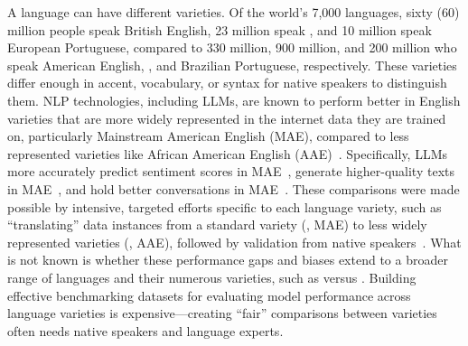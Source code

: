 

A language can have different varieties. 
Of the world's 7,000 languages, sixty (60) million people speak British English, 23 million speak \twChinese, and 10 million speak European Portuguese, compared to 330 million, 900 million, and 200 million who speak American English, \cnChinese, and Brazilian Portuguese, respectively. 
These varieties differ enough in accent, vocabulary, or syntax for native speakers to distinguish them. 
NLP technologies, including LLMs, are known to perform better in English varieties that are more widely represented in the internet data they are trained on, particularly Mainstream American English (MAE), compared to less represented varieties like African American English (AAE)~\cite{valuebench,multivaluebench}.
Specifically, LLMs more accurately predict sentiment scores in MAE~\cite{valuebench}, 
generate higher-quality texts in MAE~\cite{valuebench}, and 
hold better conversations in MAE~\cite{multivaluebench}.
These comparisons were made possible by intensive, targeted efforts specific to each language variety, such as 
``translating'' data instances from a standard variety (\eg, MAE) to less widely represented varieties (\eg, AAE), followed by validation from native speakers~\cite{valuebench,multivaluebench}.
What is not known is whether these performance gaps and biases extend to a broader range of languages and their numerous varieties, 
such as \cnChinese versus \twChinese.
Building effective benchmarking datasets for evaluating model performance across language varieties is expensive---creating ``fair'' comparisons between varieties often needs native speakers and language experts.


